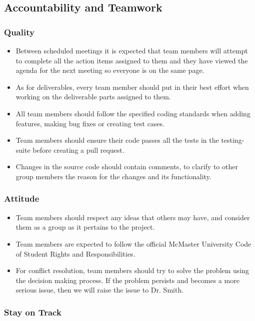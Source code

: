 \documentclass{article}
\begin{document}
\subsection*{Accountability and Teamwork}

\subsubsection*{Quality}

\begin{itemize}
    \item Between scheduled meetings it is expected that team members will attempt to complete all the action items assigned to them and they have viewed the agenda for the next meeting so everyone is on the same page.
    \item As for deliverables, every team member should put in their best effort when working on the deliverable parts assigned to them.
    \item All team members should follow the specified coding standards when adding features, making bug fixes or creating test cases.
    \item Team members should ensure their code passes all the tests in the testing-suite before creating a pull request.
    \item Changes in the source code should contain comments, to clarify to other group members the reason for the changes and its functionality.
\end{itemize}

\subsubsection*{Attitude}

\begin{itemize}
    \item Team members should respect any ideas that others may have, and consider them as a group as it pertains to the project.
    \item Team members are expected to follow the official McMaster University Code of Student Rights and Responsibilities.
    \item For conflict resolution, team members should try to solve the problem using the decision making process. If the problem persists and becomes a more serious issue, then we will raise the issue to Dr. Smith.
\end{itemize}

\subsubsection*{Stay on Track}
\end{document}
